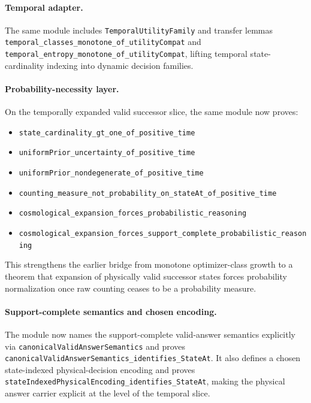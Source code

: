 \paragraph{Temporal adapter.}
The same module includes \texttt{TemporalUtilityFamily} and transfer lemmas
\texttt{temporal\_classes\_monotone\_of\_utilityCompat} and
\texttt{temporal\_entropy\_monotone\_of\_utilityCompat}, lifting temporal state-cardinality indexing into dynamic decision families.

\paragraph{Probability-necessity layer.}
On the temporally expanded valid successor slice, the same module now proves:
\begin{itemize}
\item \texttt{state\_cardinality\_gt\_one\_of\_positive\_time}
\item \texttt{uniformPrior\_uncertainty\_of\_positive\_time}
\item \texttt{uniformPrior\_nondegenerate\_of\_positive\_time}
\item \texttt{counting\_measure\_not\_probability\_on\_stateAt\_of\_positive\_time}
\item \texttt{cosmological\_expansion\_forces\_probabilistic\_reasoning}
\item \texttt{cosmological\_expansion\_forces\_support\_complete\_probabilistic\_reasoning}
\end{itemize}
This strengthens the earlier bridge from monotone optimizer-class growth to a
theorem that expansion of physically valid successor states forces probability
normalization once raw counting ceases to be a probability measure.

\paragraph{Support-complete semantics and chosen encoding.}
The module now names the support-complete valid-answer semantics explicitly via
\texttt{canonicalValidAnswerSemantics} and proves
\texttt{canonicalValidAnswerSemantics\_identifies\_StateAt}. It also defines a
chosen state-indexed physical-decision encoding and proves
\texttt{stateIndexedPhysicalEncoding\_identifies\_StateAt}, making the physical
answer carrier explicit at the level of the temporal slice.

